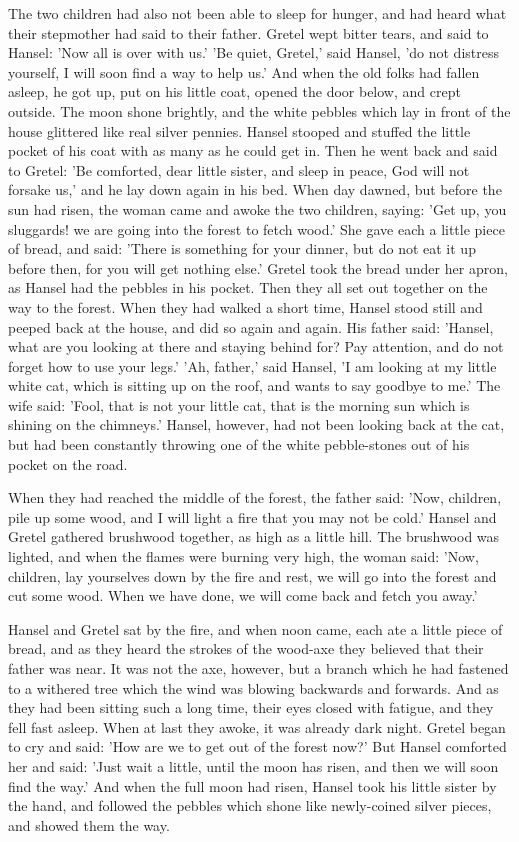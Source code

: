 \documentclass[12pt]{book}
\begin{document}
The two children had also not been able to sleep for hunger, and had
heard what their stepmother had said to their father. Gretel wept
bitter tears, and said to Hansel: 'Now all is over with us.' 'Be
quiet, Gretel,' said Hansel, 'do not distress yourself, I will soon
find a way to help us.' And when the old folks had fallen asleep, he
got up, put on his little coat, opened the door below, and crept
outside. The moon shone brightly, and the white pebbles which lay in
front of the house glittered like real silver pennies. Hansel stooped
and stuffed the little pocket of his coat with as many as he could get
in. Then he went back and said to Gretel: 'Be comforted, dear little
sister, and sleep in peace, God will not forsake us,' and he lay down
again in his bed. When day dawned, but before the sun had risen, the
woman came and awoke the two children, saying: 'Get up, you sluggards!
we are going into the forest to fetch wood.' She gave each a little
piece of bread, and said: 'There is something for your dinner, but do
not eat it up before then, for you will get nothing else.' Gretel took
the bread under her apron, as Hansel had the pebbles in his pocket.
Then they all set out together on the way to the forest. When they had
walked a short time, Hansel stood still and peeped back at the house,
and did so again and again. His father said: 'Hansel, what are you
looking at there and staying behind for? Pay attention, and do not
forget how to use your legs.' 'Ah, father,' said Hansel, 'I am looking
at my little white cat, which is sitting up on the roof, and wants to
say goodbye to me.' The wife said: 'Fool, that is not your little cat,
that is the morning sun which is shining on the chimneys.' Hansel,
however, had not been looking back at the cat, but had been constantly
throwing one of the white pebble-stones out of his pocket on the road.

When they had reached the middle of the forest, the father said: 'Now,
children, pile up some wood, and I will light a fire that you may not
be cold.' Hansel and Gretel gathered brushwood together, as high as a
little hill. The brushwood was lighted, and when the flames were
burning very high, the woman said: 'Now, children, lay yourselves down
by the fire and rest, we will go into the forest and cut some wood.
When we have done, we will come back and fetch you away.'

Hansel and Gretel sat by the fire, and when noon came, each ate a
little piece of bread, and as they heard the strokes of the wood-axe
they believed that their father was near. It was not the axe, however,
but a branch which he had fastened to a withered tree which the wind
was blowing backwards and forwards. And as they had been sitting such
a long time, their eyes closed with fatigue, and they fell fast
asleep. When at last they awoke, it was already dark night. Gretel
began to cry and said: 'How are we to get out of the forest now?' But
Hansel comforted her and said: 'Just wait a little, until the moon has
risen, and then we will soon find the way.' And when the full moon had
risen, Hansel took his little sister by the hand, and followed the
pebbles which shone like newly-coined silver pieces, and showed them
the way.
\end{document}
